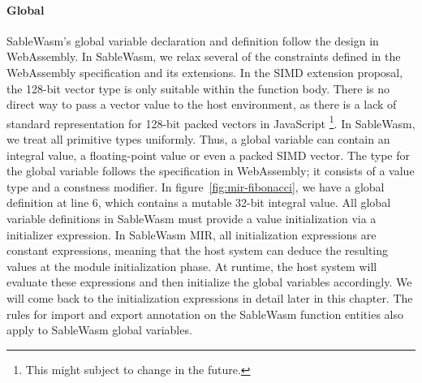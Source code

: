 \paragraph{Global}
SableWasm's global variable declaration and definition follow the design in
WebAssembly. In SableWasm, we relax several of the constraints defined in the
WebAssembly specification and its extensions. In the SIMD extension proposal,
the 128-bit vector type is only suitable within the function body. There is no
direct way to pass a vector value to the host environment, as there is a lack of
standard representation for 128-bit packed vectors in JavaScript
\footnote{This might subject to change in the future.}. In SableWasm, we treat
all primitive types uniformly. Thus, a global variable can contain an integral
value, a floating-point value or even a packed SIMD vector. The type for the
global variable follows the specification in WebAssembly; it consists of a value
type and a constness modifier. In figure~\ref{fig:mir-fibonacci}, we have a
global definition at line 6, which contains a mutable 32-bit integral value. All
global variable definitions in SableWasm must provide a value initialization via
a initializer expression. In SableWasm MIR, all initialization expressions are
constant expressions, meaning that the host system can deduce the resulting
values at the module initialization phase. At runtime, the host system will
evaluate these expressions and then initialize the global variables accordingly.
We will come back to the initialization expressions in detail later in this
chapter. The rules for import and export annotation on the SableWasm function
entities also apply to SableWasm global variables.


